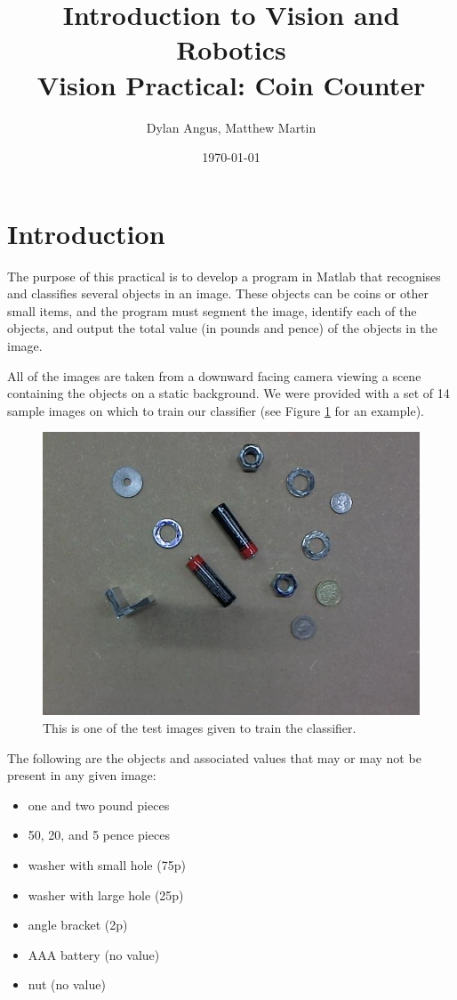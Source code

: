 \documentclass[12pt]{article}
\title{Introduction to Vision and Robotics\\Vision Practical: Coin Counter}
\author{Dylan Angus, Matthew Martin}
\date{\today}
\begin{document}
	
\maketitle

\section{Introduction}

The purpose of this practical is to develop a program in Matlab that recognises and classifies several objects in an image. These objects can be coins or other small items, and the program must segment the image, identify each of the objects, and output the total value (in pounds and pence) of the objects in the image.

All of the images are taken from a downward facing camera viewing a scene containing the objects on a static background. We were provided with a set of 14 sample images on which to train our classifier (see Figure \ref{fig:samplescene} for an example).

\begin{figure}
	\centering
	\includegraphics[width=0.75\linewidth]{02}
	\caption{This is one of the test images given to train the classifier.}
	\label{fig:samplescene}
\end{figure}

The following are the objects and associated values that may or may not be present in any given image:
\begin{itemize}
	\item one and two pound pieces
	\item 50, 20, and 5 pence pieces
	\item washer with small hole (75p)
	\item washer with large hole (25p)
	\item angle bracket (2p)
	\item AAA battery (no value)
	\item nut (no value)
\end{itemize}
\end{document}
